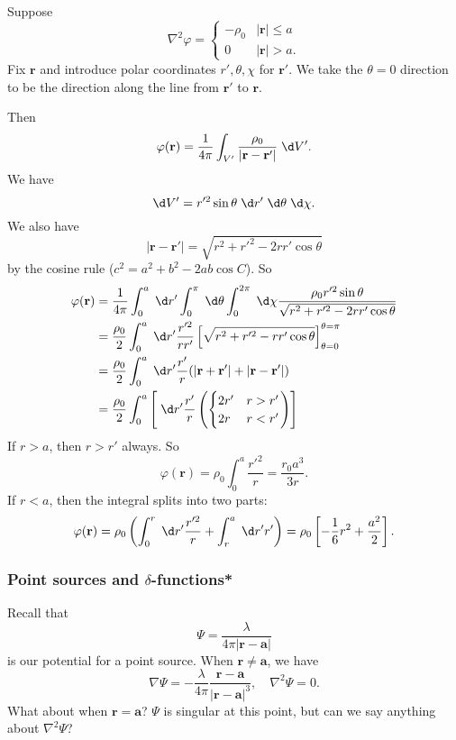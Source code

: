 \documentclass[a4paper]{article}
\begin{document}
\begin{eg}
  Suppose
  \[
    \nabla^2 \varphi =
    \begin{cases}
      -\rho_0 & |\mathbf{r}| \leq a\\
      0 & |\mathbf{r}| > a.
    \end{cases}
  \]
  Fix $\mathbf{r}$ and introduce polar coordinates $r', \theta, \chi$ for $\mathbf{r}'$. We take the $\theta = 0$ direction to be the direction along the line from $\mathbf{r}'$ to $\mathbf{r}$.

  Then
  \[
    \varphi(\mathbf{r}) = \frac{1}{4\pi}\int_{V'}\frac{\rho_0}{|\mathbf{r} - \mathbf{r}'|}\;\d V'.
  \]
  We have
  \[
    \d V' = r'^2 \sin \theta\;\d r'\;\d \theta\;\d \chi.
  \]
  We also have
  \[
    |\mathbf{r} - \mathbf{r}'| = \sqrt{r^2 + r'^2 - 2rr'\cos \theta}
  \]
  by the cosine rule ($c^2 = a^2 + b^2 - 2ab\cos C$). So
  \begin{align*}
    \varphi(\mathbf{r}) &= \frac{1}{4\pi}\int_0^a \;\d r'\int_0^\pi \;\d \theta \int_0^{2\pi}\;\d \chi \frac{\rho_0 r'^2 \sin \theta}{\sqrt{r^2 + r'^2 - 2rr'\cos \theta}}\\
    &= \frac{\rho_0}{2}\int_0^a \;\d r' \frac{r'^2}{rr'}\left[\sqrt{r^2 + r'^2 - rr'\cos \theta}\right]^{\theta = \pi}_{\theta = 0}\\
    &= \frac{\rho_0}{2}\int_0^a \;\d r' \frac{r'}{r}(|\mathbf{r} + \mathbf{r}'| + |\mathbf{r} - \mathbf{r}'|)\\
    &= \frac{\rho_0}{2}\int_0^a\left[ \;\d r' \frac{r'}{r}\left(
      \begin{cases}
        2r' & r > r'\\
        2r & r < r'
    \end{cases}\right)\right]
  \end{align*}
  If $r > a$, then $r > r'$ always. So
  \[
    \varphi(\mathbf{r}) = \rho_0 \int_0^a \frac{r'^2}{r} = \frac{r_0 a^3}{3r}.
  \]
  If $r < a$, then the integral splits into two parts:
  \[
    \varphi(\mathbf{r}) = \rho_0\left(\int_0^r \;\d r' \frac{r'^2}{r} + \int_r^a \;\d r' r'\right) = \rho_0\left[-\frac{1}{6}r^2 + \frac{a^2}{2}\right].
  \]
\end{eg}

\subsubsection{Point sources and \texorpdfstring{$\delta$}{delta}-functions*}
Recall that
\[
  \Psi = \frac{\lambda}{4\pi |\mathbf{r} - \mathbf{a}|}
\]
is our potential for a point source. When $\mathbf{r}\not = \mathbf{a}$, we have
\[
  \nabla \Psi = -\frac{\lambda}{4\pi}\frac{\mathbf{r} - \mathbf{a}}{|\mathbf{r} - \mathbf{a}|^3},\quad\nabla^2\Psi = 0.
\]
What about when $\mathbf{r} = \mathbf{a}$? $\Psi$ is singular at this point, but can we say anything about $\nabla^2 \Psi$?
\end{document}
